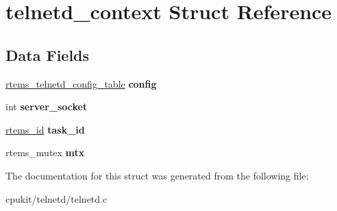 \hypertarget{structtelnetd__context}{}\section{telnetd\+\_\+context Struct Reference}
\label{structtelnetd__context}
\subsection*{Data Fields}
\begin{DoxyCompactItemize}
\item 
\mbox{\label{structtelnetd__context_ace49c632c4eb47fd06a5a6a399f3493a}} 
\mbox{\hyperlink{structrtems__telnetd__config__table}{rtems\+\_\+telnetd\+\_\+config\+\_\+table}} {\bfseries config}
\item 
\mbox{\label{structtelnetd__context_a0841cfb4e1cce24df769d028922983c0}} 
int {\bfseries server\+\_\+socket}
\item 
\mbox{\label{structtelnetd__context_af4074b72c592702202b989f25edaa784}} 
\mbox{\hyperlink{group__ClassicTasks_gab20892b814dced7dd4e5b9bf42becd57}{rtems\+\_\+id}} {\bfseries task\+\_\+id}
\item 
\mbox{\label{structtelnetd__context_ad98b3eecef333fb7a7700b19255654b2}} 
rtems\+\_\+mutex {\bfseries mtx}
\end{DoxyCompactItemize}


The documentation for this struct was generated from the following file\+:\begin{DoxyCompactItemize}
\item 
cpukit/telnetd/telnetd.\+c\end{DoxyCompactItemize}
